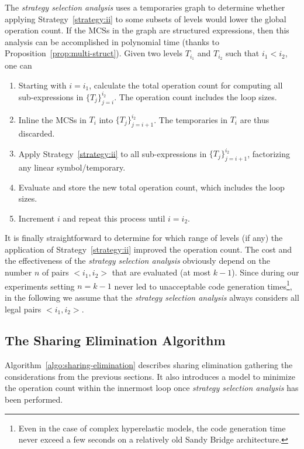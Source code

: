 The {\em strategy selection analysis} uses a temporaries graph to determine whether applying Strategy~\ref{strategy:ii} to some subsets of levels would lower the global operation count. If the MCSs in the graph are structured expressions, then this analysis can be accomplished in polynomial time (thanks to Proposition~\ref{prop:multi-struct}). Given two levels $T_{i_1}$ and $T_{i_2}$ such that $i_1 < i_2$, one can

\begin{enumerate}
\item Starting with $i = i_1$, calculate the total operation count for computing all sub-expressions in $\lbrace T_j \rbrace_{j=i}^{i_2}$. The operation count includes the loop sizes.
\item Inline the MCSs in $T_{i}$ into $\lbrace T_j \rbrace_{j=i + 1}^{i_2}$. The temporaries in $T_{i}$ are thus discarded.
\item Apply Strategy~\ref{strategy:ii} to all sub-expressions in $\lbrace T_j \rbrace_{j=i + 1}^{i_2}$, factorizing any linear symbol/temporary.
\item Evaluate and store the new total operation count, which includes the loop sizes.
\item Increment $i$ and repeat this process until $i = i_2$.
\end{enumerate}

It is finally straightforward to determine for which range of levels (if any) the application of Strategy~\ref{strategy:ii} improved the operation count. The cost and the effectiveness of the {\em strategy selection analysis} obviously depend on the number $n$ of pairs ${<}i_1, i_2{>}$ that are evaluated (at most $k - 1$). Since during our experiments setting $n = k - 1$ never led to unacceptable code generation times\footnote{Even in the case of complex hyperelastic models, the code generation time never exceed a few seconds on a relatively old Sandy Bridge architecture.}, in the following we assume that the {\em strategy selection analysis} always considers all legal pairs ${<}i_1, i_2{>}$.


\subsection{The Sharing Elimination Algorithm}
\label{sec:se-algo}
Algorithm~\ref{algo:sharing-elimination} describes sharing elimination gathering the considerations from the previous sections. It also introduces a model to minimize the operation count within the innermost loop once {\em strategy selection analysis} has been performed.


